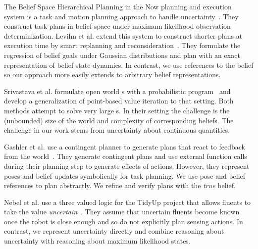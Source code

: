 
The Belief Space Hierarchical Planning in the Now planning and
execution system is a task and motion planning approach to handle
uncertainty~\cite{kaelbling2013integrated}. They construct task plans
in belief space under maximum likelihood observation
determinization. Levihn et al. extend this system to construct shorter
plans at execution time by smart replanning and
reconsideration~\cite{levihn2013foresight}. They formulate the
regression of belief goals under Gaussian distributions and plan with
an exact representation of belief state dynamics. In contrast, we use
references to the belief so our approach more easily extends to
arbitrary belief representations.

Srivastava et al. formulate open world \pomdp s with a probabilistic
program~\cite{srivastava2014first} and develop a generalization of
point-based value iteration to that setting. Both methods attempt to
solve very large \pomdp s. In their setting the challenge is the
(unbounded) size of the world and complexity of corresponding
beliefs. The challenge in our work stems from uncertainty about
continuous quantities.


Gashler et al. use a contingent planner to generate plans that react
to feedback from the world~\cite{gaschler2013kvp}. They generate
contingent plans and use external function calls during their planning
step to generate effects of actions. However, they represent poses and
belief updates symbolically for task planning. We use pose and belief
references to plan abstractly. We refine and verify plans with the
\emph{true} belief.

Nebel et al. use a three valued logic for the TidyUp project that
allows fluents to take the value
\emph{uncertain}~\cite{nebel13aaaiirs}. They assume that uncertain
fluents become known once the robot is close enough and so do not
explicitly plan sensing actions. In contrast, we represent uncertainty
directly and combine reasoning about uncertainty with reasoning about
maximum likelihood states.


